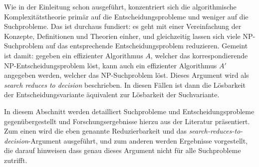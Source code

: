 Wie in der Einleitung schon ausgeführt, konzentriert sich die algorithmische Komplexitätstheorie primär auf die Entscheidungsprobleme und weniger auf die Suchprobleme. Das ist durchaus fundiert: es geht mit einer Vereinfachung der Konzepte, Definitionen und Theorien einher, und gleichzeitig lassen sich viele NP-Suchproblem auf das entsprechende Entscheidungsproblem reduzieren. Gemeint ist damit: gegeben ein effizienter Algorithmus $A$, welcher das korrespondierende NP-Entscheidungsproblem löst, kann auch ein effizienter Algorithmus $A'$ angegeben werden, welcher das NP-Suchproblem löst.
Dieses Argument wird als \emph{search reduces to decision} beschrieben. In diesen Fällen ist dann die Lösbarkeit der Entscheidungsvariante äquivalent zur Lösbarkeit der Suchvariante. 

In diesem Abschnitt werden detailliert Suchprobleme und Entscheidungsprobleme gegenübergestellt und Forschungsergebnisse hierzu aus der Literatur präsentiert.
Zum einen wird die eben genannte Reduzierbarkeit und das \emph{search-reduces-to-decision}-Argument ausgeführt, und zum anderen werden Ergebnisse vorgestellt, die darauf hinweisen dass genau dieses Argument nicht für alle Suchprobleme zutrifft.


